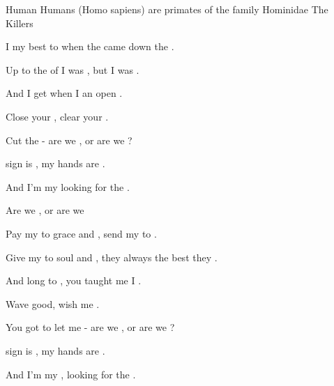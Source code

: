 \begin{SBSong}{Human}
    {Humans (Homo sapiens) are primates of the family Hominidae}
    {The Killers}
  \begin{SBVerse}
    I  my best to  when the  came down the .

    Up to the  of  I was , but I was .

    And  I get  when I  an open .

    Close your , clear your .  
  \end{SBVerse}
  \begin{SBChorus}
    Cut the  - are we ,  or are we ?

     sign is ,  my hands are .

    And I'm  my  looking for the . 

    Are we ,  or are we  
  \end{SBChorus}
  \begin{SBVerse} 
    Pay my  to grace and , send my  to .

    Give my  to soul and , they always  the best they .

    And  long to , you taught me  I .
    
    Wave good, wish me .  
  \end{SBVerse}
  \begin{SBChorus}
    You got to let me  - are we ,  or are we ?

     sign is ,  my hands are .

    And I'm  my , looking for the . 


\end{SBChorus}
\end{SBSong}
